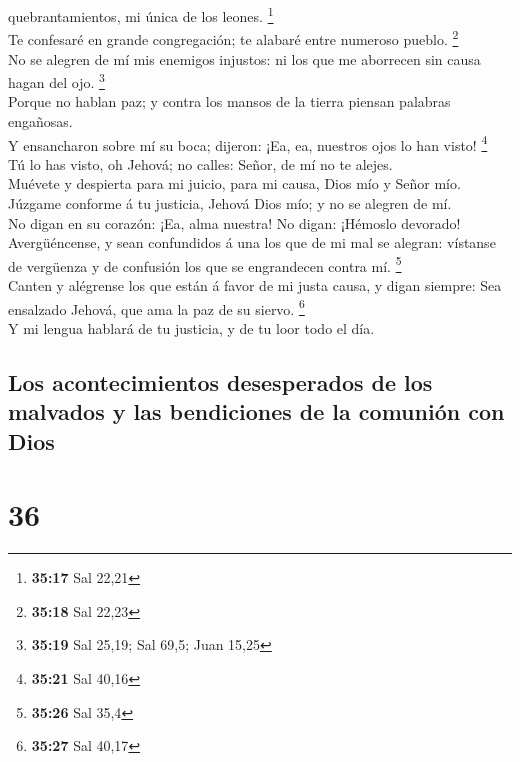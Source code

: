 quebrantamientos, mi única de los leones. \footnote{\textbf{35:17} Sal
  22,21}\\
 Te confesaré en grande congregación; te alabaré entre
numeroso pueblo. \footnote{\textbf{35:18} Sal 22,23}\\
 No se alegren de mí mis enemigos injustos: ni los que me
aborrecen sin causa hagan del ojo. \footnote{\textbf{35:19} Sal 25,19;
  Sal 69,5; Juan 15,25}\\
 Porque no hablan paz; y contra los mansos de la tierra
piensan palabras engañosas.\\
 Y ensancharon sobre mí su boca; dijeron: ¡Ea, ea,
nuestros ojos lo han visto! \footnote{\textbf{35:21} Sal 40,16}\\
 Tú lo has visto, oh Jehová; no calles: Señor, de mí no
te alejes.\\
 Muévete y despierta para mi juicio, para mi causa, Dios
mío y Señor mío.\\
 Júzgame conforme á tu justicia, Jehová Dios mío; y no se
alegren de mí.\\
 No digan en su corazón: ¡Ea, alma nuestra! No digan:
¡Hémoslo devorado!\\
 Avergüéncense, y sean confundidos á una los que de mi
mal se alegran: vístanse de vergüenza y de confusión los que se
engrandecen contra mí. \footnote{\textbf{35:26} Sal 35,4}\\
 Canten y alégrense los que están á favor de mi justa
causa, y digan siempre: Sea ensalzado Jehová, que ama la paz de su
siervo. \footnote{\textbf{35:27} Sal 40,17}\\
 Y mi lengua hablará de tu justicia, y de tu loor todo el
día.

\hypertarget{los-acontecimientos-desesperados-de-los-malvados-y-las-bendiciones-de-la-comuniuxf3n-con-dios}{%
\subsection{Los acontecimientos desesperados de los malvados y las
bendiciones de la comunión con
Dios}\label{los-acontecimientos-desesperados-de-los-malvados-y-las-bendiciones-de-la-comuniuxf3n-con-dios}}

\hypertarget{section-35}{%
\section{36}\label{section-35}}


